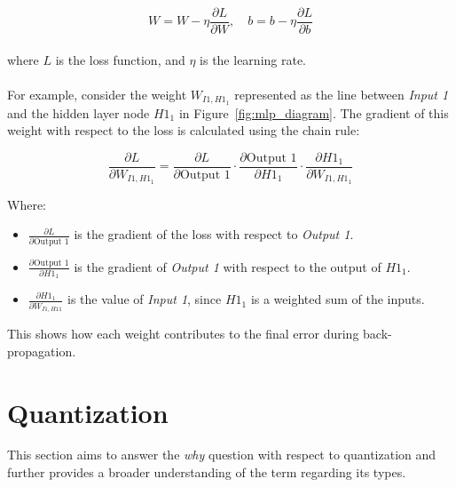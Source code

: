 \[
W = W - \eta \frac{\partial L}{\partial W}, \quad b = b - \eta \frac{\partial L}{\partial b}
\]
\\
\noindent where \( L \) is the loss function, and \( \eta \) is the learning rate.
\\
\\
For example, consider the weight \( W_{I1,H1_1} \) represented as the line between \textit{Input 1} and the hidden layer node \( H1_1 \) in Figure~\ref{fig:mlp_diagram}. 
The gradient of this weight with respect to the loss is calculated using the chain rule:

\[
\frac{\partial L}{\partial W_{I1,H1_1}} = \frac{\partial L}{\partial \text{Output 1}} \cdot \frac{\partial \text{Output 1}}{\partial H1_1} \cdot \frac{\partial H1_1}{\partial W_{I1,H1_1}}
\]

\noindent Where:
\begin{itemize}
    \item \( \frac{\partial L}{\partial \text{Output 1}} \) is the gradient of the loss with respect to \textit{Output 1}.
    \item \( \frac{\partial \text{Output 1}}{\partial H1_1} \) is the gradient of \textit{Output 1} with respect to the output of \( H1_1 \).
    \item \( \frac{\partial H1_1}{\partial W_{I1,H11}} \) is the value of \textit{Input 1}, since \( H1_1 \) is a weighted sum of the inputs.
\end{itemize}

\noindent This shows how each weight contributes to the final error during back-propagation.

\section{Quantization}
\label{sec:section1}
This section aims to answer the \textit{why} question with respect to quantization and further provides a broader understanding of the term regarding its types.

